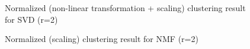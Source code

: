 \documentclass[runningheads]{llncs}
\begin{document}
\begin{figure}
\centering
{}
\caption{Normalized (non-linear transformation + scaling) clustering result for SVD (r=2)} \label{Q8_SVD_nonlinear_scale}
\end{figure}

\begin{figure}
\centering
{}
\caption{Normalized (scaling) clustering result for NMF (r=2)} \label{Q8_NMF_scale}
\end{figure}
\end{document}
